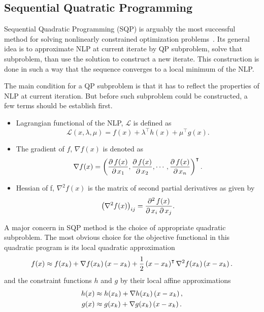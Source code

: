 \subsection{Sequential Quatratic Programming}\label{SQP:theory}
Sequential Quadratic Programming (SQP) is arguably the most successful method for solving nonlinearly constrained optimization problems~\cite{SQP:Theory}. Its general idea is to approximate NLP at current iterate by QP subproblem, solve that subproblem, than use the solution to construct a new iterate. This construction is done in such a way that the sequence converges to a local minimum of the NLP.

The main condition for a QP subproblem is that it has to reflect the properties of NLP at current iteration. But before such subproblem could be constructed, a few terms should be establish first.
\begin{itemize}
	\item Lagrangian functional of the NLP, $\mathcal{L}$ is defined as\begin{equation}
		\mathcal{L}(x,\lambda,\mu) = f(x) + \lambda^\intercal h(x) + \mu^\intercal g(x). 
	\end{equation}
	\item The gradient of $f$, $\nabla f(x)$ is denoted as
	\begin{equation}
		\nabla f(x) = \left( \frac{\partial\, f(x)}{\partial\, x_1},\frac{\partial\, f(x)}{\partial\, x_2},\cdots,\frac{\partial\, f(x)}{\partial\, x_n} \right)^\intercal.
	\end{equation}
	\item Hessian of f, $\nabla^2f(x)$ is the matrix of second partial derivatives as given by
	\begin{equation}
		\left( \nabla^2f(x) \right)_{ij} = \frac{\partial^2\, f(x)}{\partial\, x_i\; \partial\, x_j}.
	\end{equation}
\end{itemize}
A major concern in SQP method is the choice of appropriate quadratic subproblem. 
The most obvious choice for the objective functional in this quadratic program is its local quadratic approximation
\begin{equation}
f(x)\approx f(x_k)+\nabla f(x_k)\left( x-x_k \right)+\frac{1}{2}\left( x-x_k \right)^\intercal \nabla^2f(x_k)\left( x-x_k \right).
\end{equation}
and the constraint functions $h$ and $g$ by their local affine approximations
\begin{subequations}
	\begin{align}
		h(x)&\approx h(x_k)+\nabla h(x_k)\left( x-x_k \right),\\
		g(x)&\approx g(x_k)+\nabla g(x_k)\left( x-x_k \right).	
	\end{align}
\end{subequations}
